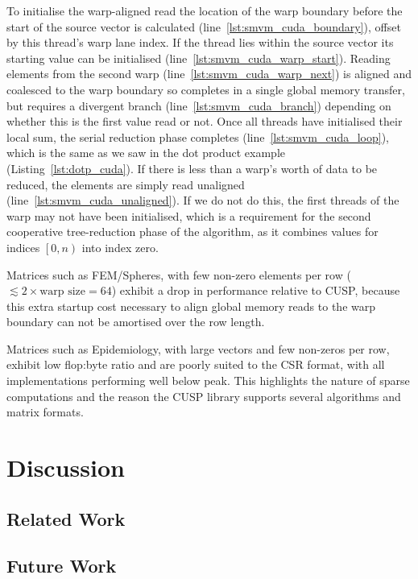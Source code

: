 To initialise the warp-aligned read the location of the warp boundary before the
start of the source vector is calculated (line~\ref{lst:smvm_cuda_boundary}),
offset by this thread's warp lane index. If the thread lies within the source
vector its starting value can be initialised
(line~\ref{lst:smvm_cuda_warp_start}). Reading elements from the second warp
(line~\ref{lst:smvm_cuda_warp_next}) is aligned and coalesced to the warp
boundary so completes in a single global memory transfer, but requires a
divergent branch (line~\ref{lst:smvm_cuda_branch}) depending on whether this is
the first value read or not. Once all threads have initialised their local sum,
the serial reduction phase completes (line~\ref{lst:smvm_cuda_loop}), which is
the same as we saw in the dot product example (Listing~\ref{lst:dotp_cuda}). If
there is less than a warp's worth of data to be reduced, the elements are simply
read unaligned (line~\ref{lst:smvm_cuda_unaligned}). If we do not do this, the
first threads of the warp may not have been initialised, which is a requirement
for the second cooperative tree-reduction phase of the algorithm, as it combines
values for indices $\left[0,n\right)$ into index zero.

Matrices such as FEM/Spheres, with few non-zero elements per row ($\lesssim 2
\times \text{warp size} = 64$) exhibit a drop in performance relative to CUSP,
because this extra startup cost necessary to align global memory reads to the
warp boundary can not be amortised over the row length.

Matrices such as Epidemiology, with large vectors and few non-zeros per row,
exhibit low flop:byte ratio and are poorly suited to the CSR format, with all
implementations performing well below peak. This highlights the nature of sparse
computations and the reason the CUSP library supports several algorithms and
matrix formats.

% 
% 

\section{Discussion}
\subsection{Related Work}
\subsection{Future Work}

